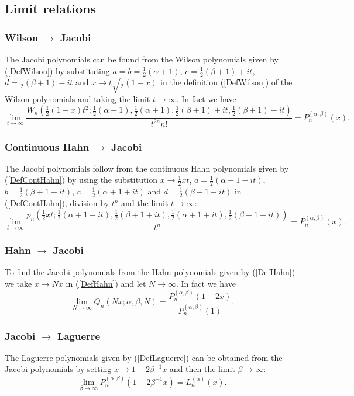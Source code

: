 \documentclass[envcountchap,graybox]{svmono}
\newcounter{rom}
\begin{document}
\subsection*{Limit relations}

\subsubsection*{Wilson $\rightarrow$ Jacobi}
The Jacobi polynomials can be found from the Wilson polynomials given by (\ref{DefWilson}) by
substituting $a=b=\frac{1}{2}(\alpha+1)$, $c=\frac{1}{2}(\beta+1)+it$,
$d=\frac{1}{2}(\beta+1)-it$ and $x\rightarrow t\sqrt{\frac{1}{2}(1-x)}$ in the
definition (\ref{DefWilson}) of the Wilson polynomials and taking the limit
$t\rightarrow\infty$. In fact we have
$$\lim_{t\rightarrow\infty}
\frac{W_n(\frac{1}{2}(1-x)t^2;\frac{1}{2}(\alpha+1),
\frac{1}{2}(\alpha+1),\frac{1}{2}(\beta+1)+it,\frac{1}{2}(\beta+1)-it)}
{t^{2n}n!}=P_n^{(\alpha,\beta)}(x).$$

\subsubsection*{Continuous Hahn $\rightarrow$ Jacobi}
The Jacobi polynomials follow from the continuous Hahn polynomials given by (\ref{DefContHahn})
by using the substitution $x\rightarrow \frac{1}{2}xt$, $a=\frac{1}{2}(\alpha+1-it)$,
$b=\frac{1}{2}(\beta+1+it)$, $c=\frac{1}{2}(\alpha+1+it)$ and $d=\frac{1}{2}(\beta+1-it)$
in (\ref{DefContHahn}), division by $t^n$ and the limit $t\rightarrow\infty$:
$$\lim_{t\rightarrow\infty}
\frac{p_n(\frac{1}{2}xt;\frac{1}{2}(\alpha+1-it),\frac{1}{2}(\beta+1+it),
\frac{1}{2}(\alpha+1+it),\frac{1}{2}(\beta+1-it))}{t^n}=P_n^{(\alpha,\beta)}(x).$$

\subsubsection*{Hahn $\rightarrow$ Jacobi}
To find the Jacobi polynomials from the Hahn polynomials given by (\ref{DefHahn}) we take
$x\rightarrow Nx$ in (\ref{DefHahn}) and let $N\rightarrow\infty$. In fact we have
$$\lim_{N\rightarrow\infty}
Q_n(Nx;\alpha,\beta,N)=\frac{P_n^{(\alpha,\beta)}(1-2x)}{P_n^{(\alpha,\beta)}(1)}.$$

\subsubsection*{Jacobi $\rightarrow$ Laguerre}
The Laguerre polynomials given by (\ref{DefLaguerre}) can be obtained from the Jacobi
polynomials by setting $x\rightarrow 1-2\beta^{-1}x$ and then the limit $\beta\rightarrow\infty$:
\begin{equation}
\lim_{\beta\rightarrow\infty}
P_n^{(\alpha,\beta)}(1-2\beta^{-1}x)=L_n^{(\alpha)}(x).
\end{equation}
\end{document}

